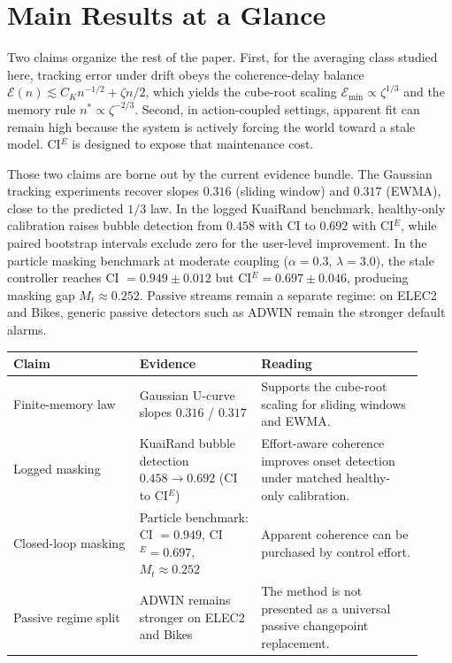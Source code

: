 \section{Main Results at a Glance}\label{sec:glance}

Two claims organize the rest of the paper. First, for the averaging class studied
here, tracking error under drift obeys the coherence-delay balance
$\mathcal{E}(n) \lesssim C_K n^{-1/2} + \zeta n/2$, which yields the cube-root
scaling $\mathcal{E}_{\min} \propto \zeta^{1/3}$ and the memory rule
$n^* \propto \zeta^{-2/3}$. Second, in action-coupled
settings, apparent fit can remain high because the system is actively forcing
the world toward a stale model. CI$^E$ is designed to expose that maintenance
cost.

Those two claims are borne out by the current evidence bundle. The Gaussian
tracking experiments recover slopes $0.316$ (sliding window) and $0.317$
(EWMA), close to the predicted $1/3$ law. In the logged KuaiRand benchmark,
healthy-only calibration raises bubble detection from $0.458$ with CI to $0.692$
with CI$^E$, while paired bootstrap intervals exclude zero for the user-level
improvement. In the particle masking benchmark at moderate coupling
($\alpha=0.3$, $\lambda=3.0$), the stale controller reaches CI $= 0.949 \pm 0.012$
but CI$^E = 0.697 \pm 0.046$, producing masking gap $M_t \approx 0.252$.
Passive streams remain a separate regime: on ELEC2 and Bikes, generic passive
detectors such as ADWIN remain the stronger default alarms.

\begin{center}
\small
\begin{tabular}{@{}p{0.29\linewidth}p{0.27\linewidth}p{0.36\linewidth}@{}}
\toprule
Claim & Evidence & Reading \\
\midrule
Finite-memory law & Gaussian U-curve slopes $0.316$ / $0.317$ & Supports the cube-root scaling for sliding windows and EWMA. \\
Logged masking & KuaiRand bubble detection $0.458 \to 0.692$ (CI to CI$^E$) & Effort-aware coherence improves onset detection under matched healthy-only calibration. \\
Closed-loop masking & Particle benchmark: CI $= 0.949$, CI$^E = 0.697$, $M_t \approx 0.252$ & Apparent coherence can be purchased by control effort. \\
Passive regime split & ADWIN remains stronger on ELEC2 and Bikes & The method is not presented as a universal passive changepoint replacement. \\
\bottomrule
\end{tabular}
\end{center}

